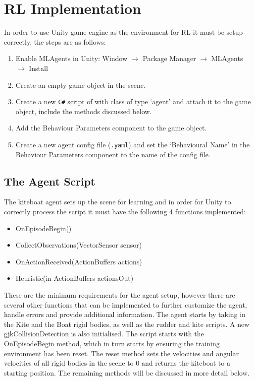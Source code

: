 \section{RL Implementation}\label{sec:RL_Implementation}

In order to use Unity game engine as the environment for RL it must be setup correctly, the steps are as follows:
\begin{enumerate}
    \item Enable MLAgents in Unity:
    Window $\rightarrow$ Package Manager $\rightarrow$ MLAgents $\rightarrow$ Install
    \item Create an empty game object in the scene.
    \item Create a new \texttt{C\#} script of with class of type `agent' and attach it to the game object, include the methods discussed below.
    \item Add the Behaviour Parameters component to the game object.
    \item Create a new agent config file (\texttt{.yaml}) and set the `Behavioural Name' in the Behaviour Parameters component to the name of the config file.
\end{enumerate}  

\subsection{The Agent Script}
The kiteboat agent sets up the scene for learning and in order for Unity to correctly process the script it must have the following 4 functions implemented:
\begin{itemize}
    \item OnEpisodeBegin()
    \item CollectObservations(VectorSensor sensor)
    \item OnActionReceived(ActionBuffers actions)
    \item Heuristic(in ActionBuffers actionsOut)
\end{itemize}

These are the minimum requirements for the agent setup, however there are several other functions that can be implemented to further customize the agent, handle errors and provide additional information. The agent starts by taking in the Kite and the Boat rigid bodies, as well as the rudder and kite scripts. A new gjkCollisionDetection is also initialised. The script starts with the OnEpisodeBegin method, which in turn starts by ensuring the training environment has been reset. The reset method sets the velocities and angular velocities of all rigid bodies in the scene to 0 and returns the kiteboat to a starting position. The remaining methods will be discussed in more detail below.


